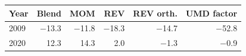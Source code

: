 \begin{tabular}{lrrrrr}
\toprule
Year & Blend & MOM & REV & REV orth. & UMD factor \\
\midrule
2009 & $-$13.3 & $-$11.8 & $-$18.3 & $-$14.7 & $-$52.8 \\
2020 & 12.3 & 14.3 & 2.0 & $-$1.3 & $-$0.9 \\
\bottomrule
\end{tabular}

